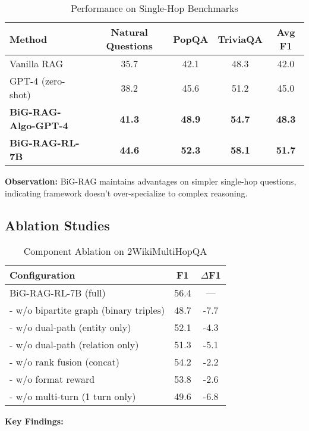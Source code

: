\documentclass[11pt,a4paper]{article}
\begin{document}
\begin{table}[h]
\centering
\caption{Performance on Single-Hop Benchmarks}
\begin{tabular}{lcccc}
\toprule
\textbf{Method} & \textbf{Natural Questions} & \textbf{PopQA} & \textbf{TriviaQA} & \textbf{Avg F1} \\
\midrule
Vanilla RAG & 35.7 & 42.1 & 48.3 & 42.0 \\
GPT-4 (zero-shot) & 38.2 & 45.6 & 51.2 & 45.0 \\
\textbf{BiG-RAG-Algo-GPT-4} & \textbf{41.3} & \textbf{48.9} & \textbf{54.7} & \textbf{48.3} \\
\textbf{BiG-RAG-RL-7B} & \textbf{44.6} & \textbf{52.3} & \textbf{58.1} & \textbf{51.7} \\
\bottomrule
\end{tabular}
\end{table}

\textbf{Observation:} BiG-RAG maintains advantages on simpler single-hop questions, indicating framework doesn't over-specialize to complex reasoning.

\subsection{Ablation Studies}

\begin{table}[h]
\centering
\caption{Component Ablation on 2WikiMultiHopQA}
\begin{tabular}{lcc}
\toprule
\textbf{Configuration} & \textbf{F1} & \textbf{$\Delta$F1} \\
\midrule
BiG-RAG-RL-7B (full) & 56.4 & --- \\
\midrule
- w/o bipartite graph (binary triples) & 48.7 & -7.7 \\
- w/o dual-path (entity only) & 52.1 & -4.3 \\
- w/o dual-path (relation only) & 51.3 & -5.1 \\
- w/o rank fusion (concat) & 54.2 & -2.2 \\
- w/o format reward & 53.8 & -2.6 \\
- w/o multi-turn (1 turn only) & 49.6 & -6.8 \\
\bottomrule
\end{tabular}
\end{table}

\textbf{Key Findings:}
\end{document}
